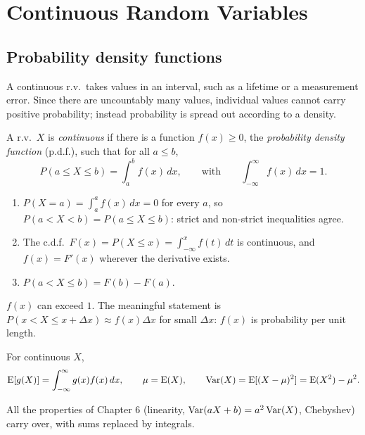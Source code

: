 \chapter{Continuous Random Variables}

\section{Probability density functions}

A continuous r.v.\ takes values in an interval, such as a lifetime or a measurement error.
Since there are uncountably many values, individual values cannot carry positive
probability; instead probability is spread out according to a density.

\begin{definition}[Continuous r.v., p.d.f.]
A r.v.\ $X$ is \emph{continuous} if there is a function $f(x)\ge0$, the
\emph{probability density function} (p.d.f.), such that for all $a\le b$,
\[
  P(a \le X \le b) = \int_a^b f(x)\,dx, \qquad\text{with}\qquad \int_{-\infty}^\infty
  f(x)\,dx = 1.
\]
\end{definition}

\begin{theorem}
\begin{enumerate}
  \item $P(X = a) = \int_a^a f(x)\,dx = 0$ for every $a$, so
        $P(a<X<b) = P(a\le X\le b)$: strict and non-strict inequalities agree.
  \item The c.d.f.\ $F(x) = P(X\le x) = \int_{-\infty}^x f(t)\,dt$ is continuous, and
        $f(x) = F'(x)$ wherever the derivative exists.
  \item $P(a < X \le b) = F(b) - F(a)$.
\end{enumerate}
\end{theorem}

\begin{important}
$f(x)$ can exceed $1$. The meaningful statement is
$P(x < X \le x + \Delta x) \approx f(x)\Delta x$ for small $\Delta x$: $f(x)$ is
probability per unit length.
\end{important}

\begin{definition}
For continuous $X$,
\[
  \operatorname{E}[g(X)] = \int_{-\infty}^\infty g(x)f(x)\,dx, \qquad \mu = \operatorname{E}(X), \qquad
  \operatorname{Var}(X) = \operatorname{E}[(X-\mu)^2] = \operatorname{E}(X^2) - \mu^2.
\]
\end{definition}

All the properties of Chapter 6 (linearity, $\operatorname{Var}(aX+b) = a^2\operatorname{Var}(X)$, Chebyshev) carry
over, with sums replaced by integrals.

